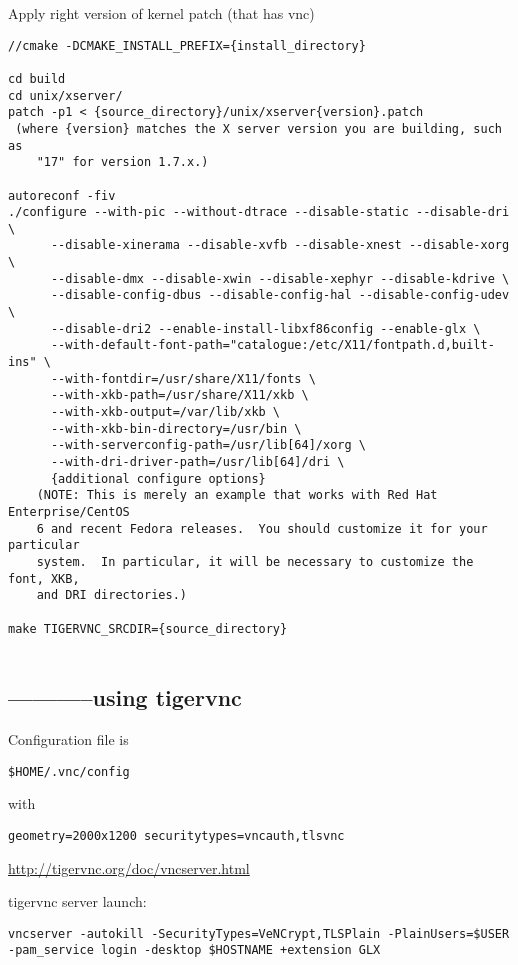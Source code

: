Apply right version of kernel patch (that has vnc)
\begin{verbatim}
//cmake -DCMAKE_INSTALL_PREFIX={install_directory}

cd build
cd unix/xserver/
patch -p1 < {source_directory}/unix/xserver{version}.patch
 (where {version} matches the X server version you are building, such as
    "17" for version 1.7.x.)

autoreconf -fiv
./configure --with-pic --without-dtrace --disable-static --disable-dri \
      --disable-xinerama --disable-xvfb --disable-xnest --disable-xorg \
      --disable-dmx --disable-xwin --disable-xephyr --disable-kdrive \
      --disable-config-dbus --disable-config-hal --disable-config-udev \
      --disable-dri2 --enable-install-libxf86config --enable-glx \
      --with-default-font-path="catalogue:/etc/X11/fontpath.d,built-ins" \
      --with-fontdir=/usr/share/X11/fonts \
      --with-xkb-path=/usr/share/X11/xkb \
      --with-xkb-output=/var/lib/xkb \
      --with-xkb-bin-directory=/usr/bin \
      --with-serverconfig-path=/usr/lib[64]/xorg \
      --with-dri-driver-path=/usr/lib[64]/dri \
      {additional configure options}
    (NOTE: This is merely an example that works with Red Hat Enterprise/CentOS
    6 and recent Fedora releases.  You should customize it for your particular
    system.  In particular, it will be necessary to customize the font, XKB,
    and DRI directories.)

make TIGERVNC_SRCDIR={source_directory}
   
\end{verbatim}



\subsection{-----------using tigervnc}

Configuration file is 
\begin{verbatim}
$HOME/.vnc/config
\end{verbatim}
with
\begin{verbatim}
geometry=2000x1200 securitytypes=vncauth,tlsvnc
\end{verbatim}

\url{http://tigervnc.org/doc/vncserver.html}

tigervnc server launch:
\begin{verbatim}
vncserver -autokill -SecurityTypes=VeNCrypt,TLSPlain -PlainUsers=$USER
-pam_service login -desktop $HOSTNAME +extension GLX 
\end{verbatim}


